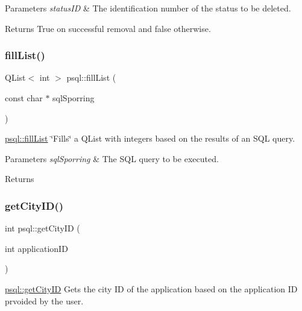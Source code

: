 \begin{DoxyParams}{Parameters}
{\em status\+ID} & The identification number of the status to be deleted. \\
\hline
\end{DoxyParams}
\begin{DoxyReturn}{Returns}
True on successful removal and false otherwise. 
\end{DoxyReturn}
\mbox{\label{classpsql_a9a3082a159c962dfcd84e23930f5619b}} 
\subsubsection{\texorpdfstring{fill\+List()}{fillList()}}
{\footnotesize\ttfamily Q\+List$<$ int $>$ psql\+::fill\+List (\begin{DoxyParamCaption}\item[{const char $\ast$}]{sql\+Sporring }\end{DoxyParamCaption})}



\hyperlink{classpsql_a9a3082a159c962dfcd84e23930f5619b}{psql\+::fill\+List} \char`\"{}\+Fills\char`\"{} a Q\+List with integers based on the results of an S\+QL query. 


\begin{DoxyParams}{Parameters}
{\em sql\+Sporring} & The S\+QL query to be executed. \\
\hline
\end{DoxyParams}
\begin{DoxyReturn}{Returns}

\end{DoxyReturn}
\mbox{\label{classpsql_af3462a12dc106e0ca8df4fa8fcf28436}} 
\subsubsection{\texorpdfstring{get\+City\+I\+D()}{getCityID()}}
{\footnotesize\ttfamily int psql\+::get\+City\+ID (\begin{DoxyParamCaption}\item[{int}]{application\+ID }\end{DoxyParamCaption})}



\hyperlink{classpsql_af3462a12dc106e0ca8df4fa8fcf28436}{psql\+::get\+City\+ID} Gets the city ID of the application based on the application ID prvoided by the user. 



